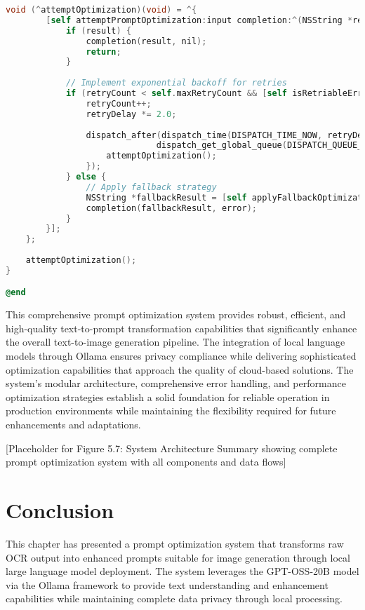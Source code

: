 \begin{table}[H]
\begin{table}[H]
\begin{lstlisting}[language=C,basicstyle=\footnotesize\ttfamily,frame=single,breaklines=true,columns=flexible,caption={Fault Tolerance Implementation},label={lst:fault_tolerance}]
    void (^attemptOptimization)(void) = ^{
        [self attemptPromptOptimization:input completion:^(NSString *result, NSError *error) {
            if (result) {
                completion(result, nil);
                return;
            }
            
            // Implement exponential backoff for retries
            if (retryCount < self.maxRetryCount && [self isRetriableError:error]) {
                retryCount++;
                retryDelay *= 2.0;
                
                dispatch_after(dispatch_time(DISPATCH_TIME_NOW, retryDelay * NSEC_PER_SEC), 
                              dispatch_get_global_queue(DISPATCH_QUEUE_PRIORITY_DEFAULT, 0), ^{
                    attemptOptimization();
                });
            } else {
                // Apply fallback strategy
                NSString *fallbackResult = [self applyFallbackOptimization:input];
                completion(fallbackResult, error);
            }
        }];
    };
    
    attemptOptimization();
}

@end
\end{lstlisting}

This comprehensive prompt optimization system provides robust, efficient, and high-quality text-to-prompt transformation capabilities that significantly enhance the overall text-to-image generation pipeline. The integration of local language models through Ollama ensures privacy compliance while delivering sophisticated optimization capabilities that approach the quality of cloud-based solutions. The system's modular architecture, comprehensive error handling, and performance optimization strategies establish a solid foundation for reliable operation in production environments while maintaining the flexibility required for future enhancements and adaptations.

[Placeholder for Figure 5.7: System Architecture Summary showing complete prompt optimization system with all components and data flows]

\section{Conclusion}

This chapter has presented a prompt optimization system that transforms raw OCR output into enhanced prompts suitable for image generation through local large language model deployment. The system leverages the GPT-OSS-20B model via the Ollama framework to provide text understanding and enhancement capabilities while maintaining complete data privacy through local processing.


\end{table}
\end{table}
